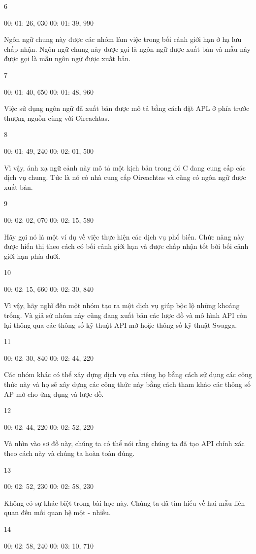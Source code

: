 6

00: 01: 26, 030 00: 01: 39, 990

Ngôn ngữ chung này được các nhóm làm việc trong bối cảnh giới hạn ở hạ lưu chấp nhận. Ngôn ngữ chung này được gọi là ngôn ngữ được xuất bản và mẫu này được gọi là mẫu ngôn ngữ được xuất bản.

7

00: 01: 40, 650 00: 01: 48, 960

Việc sử dụng ngôn ngữ đã xuất bản được mô tả bằng cách đặt APL ở phía trước thượng nguồn cùng với Oireachtas.

8

00: 01: 49, 240 00: 02: 01, 500

Vì vậy, ánh xạ ngữ cảnh này mô tả một kịch bản trong đó C đang cung cấp các dịch vụ chung. Tức là nó có nhà cung cấp Oireachtas và cũng có ngôn ngữ được xuất bản.

9

00: 02: 02, 070 00: 02: 15, 580

Hãy gọi nó là một ví dụ về việc thực hiện các dịch vụ phổ biến. Chức năng này được hiển thị theo cách có bối cảnh giới hạn và được chấp nhận tốt bởi bối cảnh giới hạn phía dưới.

10

00: 02: 15, 660 00: 02: 30, 840

Vì vậy, hãy nghĩ đến một nhóm tạo ra một dịch vụ giúp bộc lộ những khoảng trống. Và giả sử nhóm này cũng đang xuất bản các lược đồ và mô hình API còn lại thông qua các thông số kỹ thuật API mở hoặc thông số kỹ thuật Swagga.

11

00: 02: 30, 840 00: 02: 44, 220

Các nhóm khác có thể xây dựng dịch vụ của riêng họ bằng cách sử dụng các công thức này và họ sẽ xây dựng các công thức này bằng cách tham khảo các thông số AP mở cho ứng dụng và lược đồ.

12

00: 02: 44, 220 00: 02: 52, 220

Và nhìn vào sơ đồ này, chúng ta có thể nói rằng chúng ta đã tạo API chính xác theo cách này và chúng ta hoàn toàn đúng.

13

00: 02: 52, 230 00: 02: 58, 230

Không có sự khác biệt trong bài học này. Chúng ta đã tìm hiểu về hai mẫu liên quan đến mối quan hệ một - nhiều.

14

00: 02: 58, 240 00: 03: 10, 710

